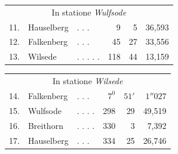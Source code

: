 \begin{center}
\begin{tabular}{r l l r r r}
\multicolumn{6}{c}{In statione \textit{Wulfsode}}\\[5pt]
11.&Hauselberg&. . .&9&5&36,593\\
12.&Falkenberg&. . .&45&27&33,556\\
13.&Wilsede&. . . . .&118&44&13,159
\end{tabular}
\end{center}
\begin{center}
\begin{tabular}{r l l r r r}
\multicolumn{6}{c}{In statione \textit{Wilsede}}\\[5pt]
14.&Falkenberg&. . .&\(7^0\)&\(51'\)&\(1''027\)\\
15.&Wulfsode&. . . .&298&29&49,519\\
16.&Breithorn&. . . .&330&3&7,392\\
17.&Hauselberg&. . .&334&25&26,746
\end{tabular}
\end{center}


